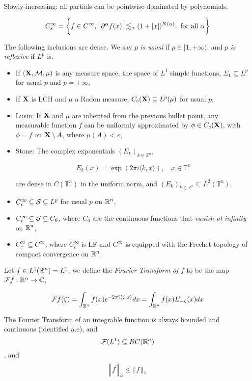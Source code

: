 \documentclass[../main-manifolds.tex]{subfiles}
\begin{document}
\begin{definition}
Slowly-increasing: all partials can be pointwise-dominated by polynomials.

\[
C_{s}^\infty = \biggl\{{f\in C^\infty,\: \vert \partial^\alpha f(x)\vert \lesssim_{\alpha} (1+\vert x\vert)^{N(\alpha)},\text{ for all }\alpha}\biggr\}
\]
\end{definition}
\begin{lemma}
    The following inclusions are dense. We say \emph{$p$ is usual} if $p\in [1,+\infty)$, and \emph{$p$ is reflexive} if $L^p$ is.
    
    \begin{itemize}
        \item If $({\mathbf{X}},\mathcal{M},\mu)$ is any measure space, the space of $L^1$ simple functions, $\Sigma_{1}\subseteq L^p$ for usual $p$ and $p=+\infty$,
        \item If ${\mathbf{X}}$ is LCH and $\mu$ a Radon measure, $C_c({\mathbf{X}})\subseteq L^p(\mu)$ for usual $p$,
        \item Lusin: If ${\mathbf{X}}$ and $\mu$ are inherited from the previous bullet point, any measurable function $f$ can be uniformly approximated by $\phi\in C_c({\mathbf{X}})$, with $\phi=f$ on ${\mathbf{X}}\setminus A$, where $\mu(A)<\varepsilon$,
        \item Stone: The complex exponentials $(E_{k})_{k\in\mathbb{Z}^n}$,
        
        $$E_k(x) = \exp(2\pi i\langle k,x\rangle),\quad x\in\mathbb{T}^n$$
        
        are dense in $C(\mathbb{T}^n)$ in the uniform norm, and $(E_k)_{k\in \mathbb{Z}^n}\subseteq L^2(\mathbb{T}^n)$.
        \item $C_c^\infty\subseteq\mathcal{S}\subseteq L^p$ for usual $p$ on ${\mathbb{R}^n}$,
        \item $C_c^\infty\subseteq\mathcal{S}\subseteq C_0$, where $C_0$ are the continuous functions that \emph{vanish at infinity}  on ${\mathbb{R}^n}$,
        \item $C_c^\infty\subseteq C^\infty$, where $C_c^\infty$ is LF and $C^\infty$ is equipped with the Frechet topology of compact convergence on ${\mathbb{R}^n}$.
    \end{itemize}

\end{lemma}



\begin{definition}
Let $f\in L^1({\mathbb{R}^n}) = L^1$, we define the \emph{Fourier Transform of $f$} to be the map $\mathcal{F}f: \mathbb{R}^n\to\mathbb{C}$,

\[
\mathcal{F}f(\zeta) = \int_{{\mathbb{R}^n}}f(x)e^{-2\pi i\langle \zeta,x\rangle}dx = \int_{{\mathbb{R}^n}} f(x)E_{-\zeta}(x)dx
\]
\end{definition}
\begin{lemma}
    The Fourier Transform of an integrable function is always bounded and continuous (identified a.e), and $$\mathcal{F} (L^1)\subseteq BC({\mathbb{R}^n})$$, and 
    \[
    \norm{\hat{f}}_u\leq \norm{f}_1
    \]
\end{lemma}
\end{document}
